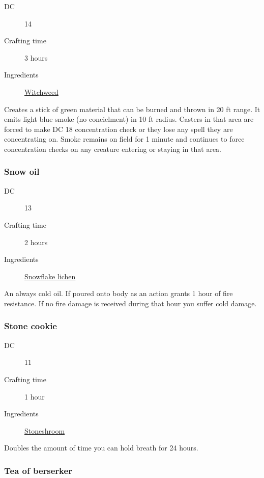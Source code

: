 \begin{description}
\item [DC] 14 \survival
\item [Crafting time] 3 hours
\item [Ingredients] \hyperref[Witchweed]{Witchweed}
\end{description}

Creates a stick of green material that can be burned and thrown in 20 ft range. It emits light blue smoke 
(no concielment) in 10 ft radius. Casters in that area are forced to make DC 18 concentration check 
or they lose any spell they are concentrating on. 
Smoke remains on field for 1 minute and continues to force concentration checks on any creature entering or staying in that area.

\subsubsection{Snow oil}
\label{Snow oil}

\begin{description}
\item [DC] 13 \survival
\item [Crafting time] 2 hours
\item [Ingredients] \hyperref[Snowflake Lichen]{Snowflake lichen}
\end{description}

An always cold oil. If poured onto body as an action grants 1 hour of fire resistance. 
If no fire damage is received during that hour you suffer  cold damage.

\subsubsection{Stone cookie}
\label{Stone cookie}

\begin{description}
\item [DC] 11 \survival
\item [Crafting time] 1 hour
\item [Ingredients] \hyperref[Stoneshroom]{Stoneshroom}
\end{description}

Doubles the amount of time you can hold breath for 24 hours.

\subsubsection{Tea of berserker}
\label{Tea of berserker}

